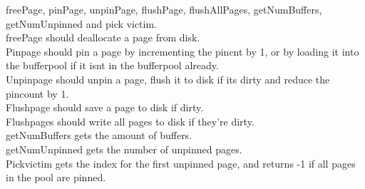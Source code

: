 \documentclass[a4paper,10pt,titlepage]{report}
\begin{document}
freePage, pinPage, unpinPage, flushPage, flushAllPages, getNumBuffers, getNumUnpinned and pick victim. \\

freePage should deallocate a page from disk.\\

Pinpage should pin a page by incrementing the pincnt by 1, or by loading it into the bufferpool if it isnt in the bufferpool already.\\

Unpinpage should unpin a page, flush it to disk if its dirty and reduce the pincount by 1.\\

Flushpage should save a page to disk if dirty.\\

Flushpages should write all pages to disk if they're dirty.\\

getNumBuffers gets the amount of buffers.\\

getNumUnpinned gets the number of unpinned pages.\\

Pickvictim gets the index for the first unpinned page, and returns -1 if all pages in the pool are pinned.

%
\end{document}
